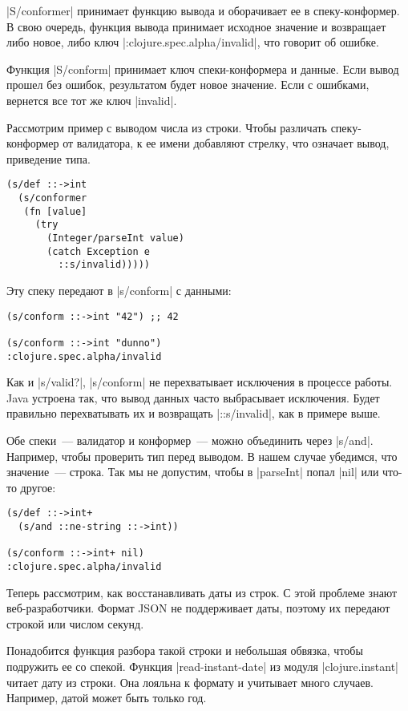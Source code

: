 \spverb|S/conformer| принимает функцию вывода и оборачивает ее в
спеку-конформер. В свою очередь, функция вывода принимает исходное значение и
возвращает либо новое, либо ключ \spverb|:clojure.spec.alpha/invalid|, что
говорит об ошибке.

Функция \spverb|S/conform| принимает ключ спеки-конформера и данные. Если вывод
прошел без ошибок, результатом будет новое значение. Если с ошибками, вернется
все тот же ключ \spverb|invalid|.

Рассмотрим пример с выводом числа из строки. Чтобы различать спеку-конформер от
валидатора, к ее имени добавляют стрелку, что означает вывод, приведение типа.

\begin{verbatim}
(s/def ::->int
  (s/conformer
   (fn [value]
     (try
       (Integer/parseInt value)
       (catch Exception e
         ::s/invalid)))))
\end{verbatim}

Эту спеку передают в \spverb|s/conform| с данными:

\begin{verbatim}
(s/conform ::->int "42") ;; 42

(s/conform ::->int "dunno")
:clojure.spec.alpha/invalid
\end{verbatim}

Как и \spverb|s/valid?|, \spverb|s/conform| не перехватывает исключения в
процессе работы. Java устроена так, что вывод данных часто выбрасывает
исключения. Будет правильно перехватывать их и возвращать \spverb|::s/invalid|,
как в примере выше.

Обе спеки~--- валидатор и конформер~--- можно объединить через
\spverb|s/and|. Например, чтобы проверить тип перед выводом. В нашем случае
убедимся, что значение~--- строка. Так мы не допустим, чтобы в \spverb|parseInt|
попал \spverb|nil| или что-то другое:

\begin{verbatim}
(s/def ::->int+
  (s/and ::ne-string ::->int))

(s/conform ::->int+ nil)
:clojure.spec.alpha/invalid
\end{verbatim}

Теперь рассмотрим, как восстанавливать даты из строк. С этой проблеме знают
веб-разработчики. Формат JSON не поддерживает даты, поэтому их передают строкой
или числом секунд.

Понадобится функция разбора такой строки и небольшая обвязка, чтобы подружить ее
со спекой. Функция \spverb|read-instant-date| из модуля \spverb|clojure.instant|
читает дату из строки. Она лояльна к формату и учитывает много
случаев. Например, датой может быть только год.

